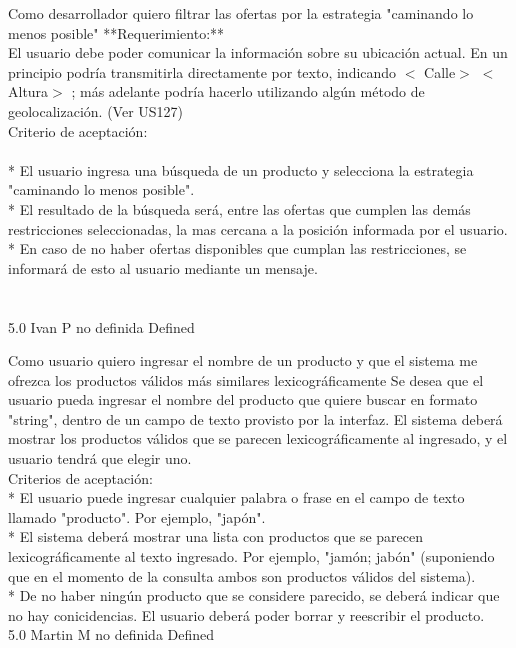 \vspace{20pt}

	{Como desarrollador quiero filtrar las ofertas por la estrategia "caminando lo menos posible"} %
	{**Requerimiento:**\\
El usuario debe poder comunicar la información sobre su ubicación actual. En
un principio podría transmitirla directamente por texto, indicando
$<$ Calle$>$ $<$ Altura$>$ ; más adelante podría hacerlo utilizando algún método de
geolocalización. (Ver US127)
  \\
Criterio de aceptación:\\
  \\
* El usuario ingresa una búsqueda de un producto y selecciona la estrategia "caminando lo menos posible".  \\
* El resultado de la búsqueda será, entre las ofertas que cumplen las demás restricciones seleccionadas, la mas cercana a la posición informada por el usuario.\\
* En caso de no haber ofertas disponibles que cumplan las restricciones, se informará de esto al usuario mediante un mensaje. \\
  \\
  \\
} %
	{} %
	{5.0} %
	{Ivan P} %
	{no definida} %
	{Defined} %


\vspace{20pt}

	{Como usuario quiero ingresar el nombre de un producto y que el sistema me ofrezca los productos válidos más similares lexicográficamente} %
	{Se desea que el usuario pueda ingresar el nombre del producto que quiere
buscar en formato "string", dentro de un campo de texto provisto por la
interfaz. El sistema deberá mostrar los productos válidos que se parecen
lexicográficamente al ingresado, y el usuario tendrá que elegir uno.
  \\
Criterios de aceptación:\\
* El usuario puede ingresar cualquier palabra o frase en el campo de texto llamado "producto". Por ejemplo, "japón".  \\
* El sistema deberá mostrar una lista con productos que se parecen lexicográficamente al texto ingresado. Por ejemplo, "jamón; jabón" (suponiendo que en el momento de la consulta ambos son productos válidos del sistema).  \\
* De no haber ningún producto que se considere parecido, se deberá indicar que no hay conicidencias. El usuario deberá poder borrar y reescribir el producto.\\
} %
	{} %
	{5.0} %
	{Martin M} %
	{no definida} %
	{Defined} %


